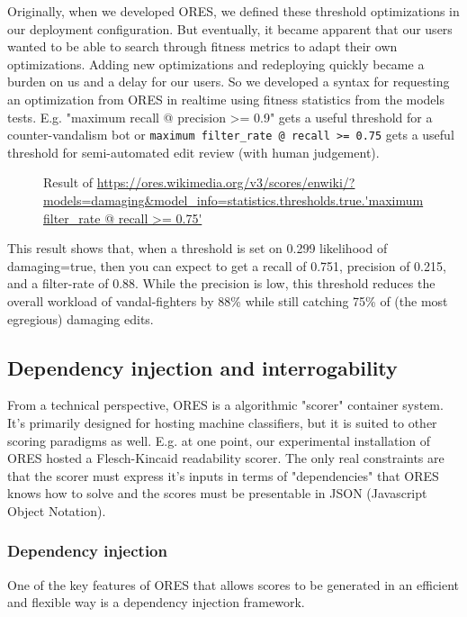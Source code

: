 Originally, when we developed ORES, we defined these threshold optimizations in our deployment configuration.  But eventually, it became apparent that our users wanted to be able to search through fitness metrics to adapt their own optimizations.  Adding new optimizations and redeploying quickly became a burden on us and a delay for our users.  So we developed a syntax for requesting an optimization from ORES in realtime using fitness statistics from the models tests. E.g. "maximum recall @ precision >= 0.9" gets a useful threshold for a counter-vandalism bot or \texttt{maximum filter\_rate @ recall >= 0.75} gets a useful threshold for semi-automated edit review (with human judgement).

\begin{figure}[htbp]
        \caption{Result of \url{https://ores.wikimedia.org/v3/scores/enwiki/?models=damaging&model_info=statistics.thresholds.true.'maximum filter_rate @ recall >= 0.75'}}
        \label{fig:english_damaging_threshold_optimization}
\end{figure}

This result shows that, when a threshold is set on 0.299 likelihood of damaging=true, then you can expect to get a recall of 0.751, precision of 0.215, and a filter-rate of 0.88.  While the precision is low, this threshold reduces the overall workload of vandal-fighters by 88\% while still catching 75\% of (the most egregious) damaging edits.

\subsection{Dependency injection and interrogability}
From a technical perspective, ORES is a algorithmic "scorer" container system.  It's primarily designed for hosting machine classifiers, but it is suited to other scoring paradigms as well.  E.g. at one point, our experimental installation of ORES hosted a Flesch-Kincaid readability scorer.  The only real constraints are that the scorer must express it's inputs in terms of "dependencies" that ORES knows how to solve and the scores must be presentable in JSON (Javascript Object Notation).

\subsubsection{Dependency injection}
One of the key features of ORES that allows scores to be generated in an efficient and flexible way is a dependency injection framework.

